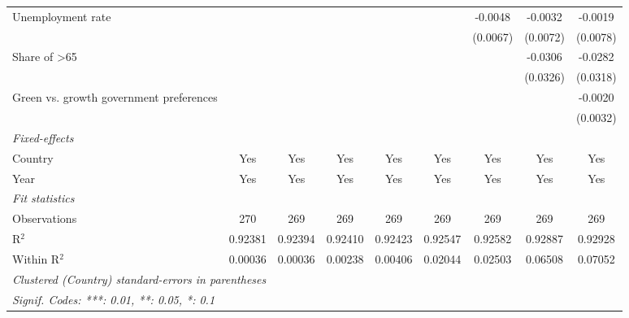 \begin{table}[htbp]
\begin{tabular}{lcccccccc}
      Unemployment rate                                                  &          &          &          &          &          & -0.0048  & -0.0032  & -0.0019\\   
                                                                         &          &          &          &          &          & (0.0067) & (0.0072) & (0.0078)\\   
      Share of >65                                                       &          &          &          &          &          &          & -0.0306  & -0.0282\\   
                                                                         &          &          &          &          &          &          & (0.0326) & (0.0318)\\   
      Green vs. growth government preferences                            &          &          &          &          &          &          &          & -0.0020\\   
                                                                         &          &          &          &          &          &          &          & (0.0032)\\   
      \midrule
      \emph{Fixed-effects}\\
      Country                                                            & Yes      & Yes      & Yes      & Yes      & Yes      & Yes      & Yes      & Yes\\  
      Year                                                               & Yes      & Yes      & Yes      & Yes      & Yes      & Yes      & Yes      & Yes\\  
      \midrule
      \emph{Fit statistics}\\
      Observations                                                       & 270      & 269      & 269      & 269      & 269      & 269      & 269      & 269\\  
      R$^2$                                                              & 0.92381  & 0.92394  & 0.92410  & 0.92423  & 0.92547  & 0.92582  & 0.92887  & 0.92928\\  
      Within R$^2$                                                       & 0.00036  & 0.00036  & 0.00238  & 0.00406  & 0.02044  & 0.02503  & 0.06508  & 0.07052\\  
      \midrule \midrule
      \multicolumn{9}{l}{\emph{Clustered (Country) standard-errors in parentheses}}\\
      \multicolumn{9}{l}{\emph{Signif. Codes: ***: 0.01, **: 0.05, *: 0.1}}\\
   \end{tabular}
\end{table}


